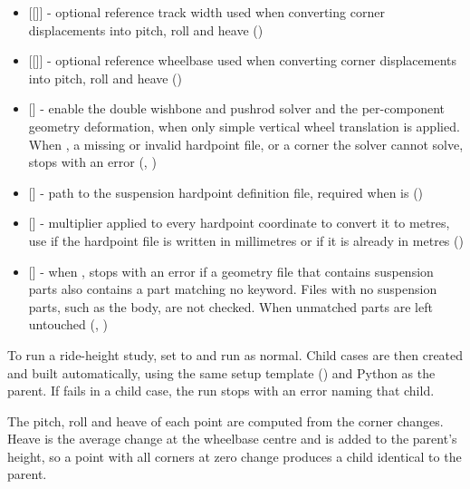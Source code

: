 \begin{itemize}
    \item {} [[]] - optional reference track width used when converting corner displacements into pitch, roll and heave ()

    \item {} [[]] - optional reference wheelbase used when converting corner displacements into pitch, roll and heave ()

    \item {} [] - enable the double wishbone and pushrod solver and the per-component geometry deformation, when  only simple vertical wheel translation is applied. When , a missing or invalid hardpoint file, or a corner the solver cannot solve, stops  with an error (, )

    \item {} [] - path to the suspension hardpoint definition file, required when  is  ()

    \item {} [] - multiplier applied to every hardpoint coordinate to convert it to metres, use  if the hardpoint file is written in millimetres or  if it is already in metres ()

    \item {} [] - when ,  stops with an error if a geometry file that contains suspension parts also contains a part matching no keyword. Files with no suspension parts, such as the body, are not checked. When  unmatched parts are left untouched (, )
\end{itemize}
To run a ride-height study, set  to  and run  as normal. Child cases are then created and built automatically, using the same setup template () and Python as the parent. If  fails in a child case, the run stops with an error naming that child.

The pitch, roll and heave of each point are computed from the corner changes. Heave is the average change at the wheelbase centre and is added to the parent's  height, so a point with all corners at zero change produces a child identical to the parent.

